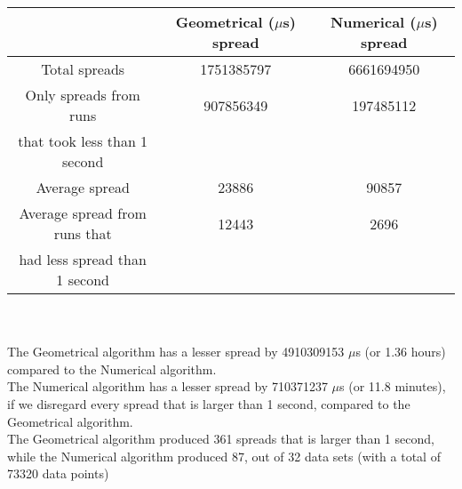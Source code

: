 \begin{tabular}[3]{c|c|c}
 & Geometrical ($\mu$s) spread & Numerical ($\mu$s) spread\\
\hline
Total spreads & 1751385797 & 6661694950 \\ 
\hline 
Only spreads from runs & 907856349 & 197485112 \\ 
that took less than 1 second & & \\ 
\hline
Average spread & 23886 & 90857 \\
\hline
Average spread from runs that & 12443 & 2696 \\ 
had less spread than 1 second & & \\ 
\end{tabular}\\ \\
The Geometrical algorithm has a lesser spread by 4910309153 $\mu$s (or 1.36 hours) compared to the Numerical algorithm.\\
The Numerical algorithm has a lesser spread by 710371237 $\mu$s (or 11.8 minutes), if we disregard every spread that is larger than 1 second, compared to the Geometrical algorithm.\\
The Geometrical algorithm produced 361 spreads that is larger than 1 second, while the Numerical algorithm produced 87, out of 32 data sets (with a total of 73320 data points)\\
